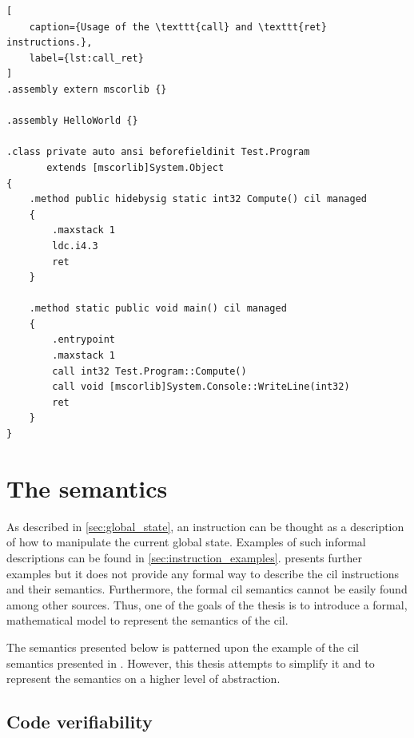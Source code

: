 \documentclass[declaration,shortabstract,english,mgr]{iithesis}
\begin{document}
\begin{lstlisting}[
	caption={Usage of the \texttt{call} and \texttt{ret} instructions.},
	label={lst:call_ret}
]
.assembly extern mscorlib {}

.assembly HelloWorld {}

.class private auto ansi beforefieldinit Test.Program
       extends [mscorlib]System.Object
{
	.method public hidebysig static int32 Compute() cil managed
	{
		.maxstack 1
		ldc.i4.3
		ret
	}

	.method static public void main() cil managed
	{
		.entrypoint
		.maxstack 1
		call int32 Test.Program::Compute()
		call void [mscorlib]System.Console::WriteLine(int32)
		ret
	}
}
\end{lstlisting}

\clearpage


\chapter{The semantics}
\label{sec:semantics}

As described in \ref{sec:global_state}, an instruction can be thought as a description of how to manipulate the current global state. Examples of such informal descriptions can be found in \ref{sec:instruction_examples}. \cite{ecmaStandard} presents further examples but it does not provide any formal way to describe the \acrshort{cil} instructions and their semantics. Furthermore, the formal \acrshort{cil} semantics cannot be easily found among other sources. Thus, one of the goals of the thesis is to introduce a formal, mathematical model to represent the semantics of the \acrshort{cil}.

The semantics presented below is patterned upon the example of the \acrshort{cil} semantics presented in \cite{zychlaThesis}. However, this thesis attempts to simplify it and to represent the semantics on a higher level of abstraction.

\section{Code verifiability}
\label{sec:codeVerifiability}
\end{document}
